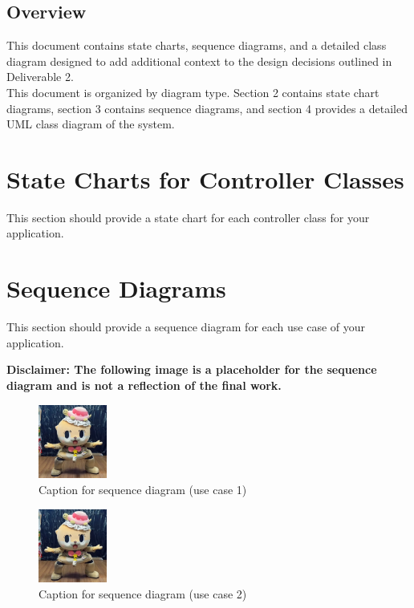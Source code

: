 \documentclass[]{article}
\begin{document}
\subsection{Overview}
\label{sub:overview}
This document contains state charts, sequence diagrams, and a detailed class diagram designed to add additional context
to the design decisions outlined in Deliverable 2.\medskip \\
This document is organized by diagram type. Section 2 contains state chart diagrams, section 3
contains sequence diagrams, and section 4 provides a detailed UML class diagram of the system.



\section{State Charts for Controller Classes}
\label{sec:state_charts_for_controller_classes}
This section should provide a state chart for each controller class for your application.

\section{Sequence Diagrams}
\label{sec:sequence_diagrams}
This section should provide a sequence diagram for each use case of your application.

\textbf{Disclaimer: The following image is a placeholder for the sequence diagram and is not a reflection of the final work.}


\begin{figure}[H]
    \centering
    \includegraphics[width=0.2\textwidth]{removelater.jpg}
    \caption{Caption for sequence diagram (use case 1)}
\end{figure}

\begin{figure}[H]
    \centering
    \includegraphics[width=0.2\textwidth]{removelater.jpg}
    \caption{Caption for sequence diagram (use case 2)}
\end{figure}
\end{document}
